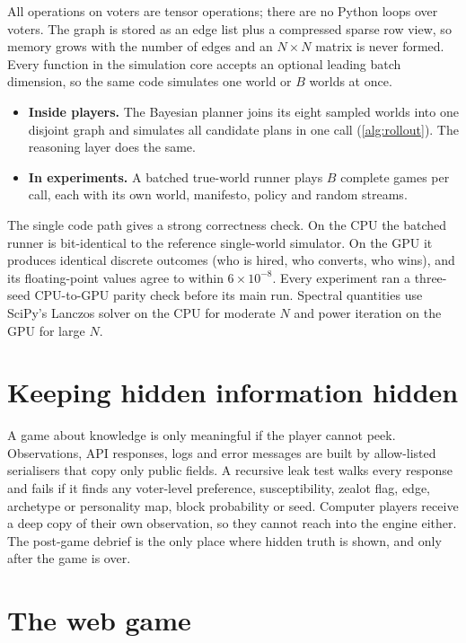 \documentclass[11pt,a4paper,oneside]{report}
\begin{document}
All operations on voters are tensor operations; there are no Python loops over voters. The graph is stored
as an edge list plus a compressed sparse row view, so memory grows with the number of edges and an
$N\times N$ matrix is never formed. Every function in the simulation core accepts an optional leading batch
dimension, so the same code simulates one world or $B$ worlds at once.
\begin{itemize}
  \item \textbf{Inside players.} The Bayesian planner joins its eight sampled worlds into one disjoint graph
        and simulates all candidate plans in one call (\cref{alg:rollout}). The reasoning layer does the
        same.
  \item \textbf{In experiments.} A batched true-world runner plays $B$ complete games per call, each with
        its own world, manifesto, policy and random streams.
\end{itemize}
The single code path gives a strong correctness check. On the CPU the batched runner is bit-identical to
the reference single-world simulator. On the GPU it produces identical discrete outcomes (who is hired, who
converts, who wins), and its floating-point values agree to within $6\times10^{-8}$. Every experiment ran a
three-seed CPU-to-GPU parity check before its main run. Spectral quantities use SciPy's Lanczos solver on
the CPU for moderate $N$ and power iteration on the GPU for large $N$.

\section{Keeping hidden information hidden}

A game about knowledge is only meaningful if the player cannot peek. Observations, API responses, logs and
error messages are built by allow-listed serialisers that copy only public fields. A recursive leak test
walks every response and fails if it finds any voter-level preference, susceptibility, zealot flag, edge,
archetype or personality map, block probability or seed. Computer players receive a deep copy of their own
observation, so they cannot reach into the engine either. The post-game debrief is the only place where
hidden truth is shown, and only after the game is over.

\section{The web game}
\end{document}
